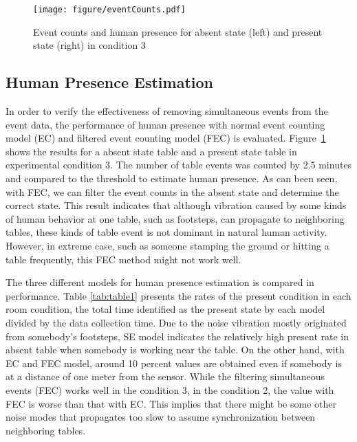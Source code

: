 \documentclass{sig-alternate-ipsn13}
\begin{document}



\begin{figure}[h]
  \centering
  \texttt{[image: figure/eventCounts.pdf]}
  \caption{Event counts and human presence for absent state (left) and present state (right) in condition 3}
  \label{fig:EventCounts}
\end{figure}

\subsection{Human Presence Estimation}
In order to verify the effectiveness of removing simultaneous events from the event data, the performance of human presence with normal event counting model (EC) and filtered event counting model (FEC) is evaluated. Figure~\ref{fig:EventCounts} shows the results for a absent state table and a present state table in experimental condition 3. The number of table events was counted by 2.5 minutes and compared to the threshold to estimate human presence. As can been seen, with FEC, we can filter the event counts in the absent state and determine the correct state. This result indicates that although vibration caused by some kinds of human behavior at one table, such as footsteps, can propagate to neighboring tables, these kinds of table event is not dominant in natural human activity. However, in extreme case, such as someone stamping the ground or hitting a table frequently, this FEC method might not work well.

The three different models for human presence estimation is compared in performance. Table \ref{tab:table1} presents the rates of the present condition in each room condition, the total time identified as the present state by each model divided by the data collection time. Due to the noise vibration mostly originated from somebody's footsteps, SE model indicates the relatively high present rate in absent table when somebody is working near the table. On the other hand, with EC and FEC model, around 10 percent values are obtained even if somebody is at a distance of one meter from the sensor. While the filtering simultaneous events (FEC) works well in the condition 3, in the condition 2, the value with FEC is worse than that with EC. This implies that there might be some other noise modes that propagates too slow to assume synchronization between neighboring tables.
\end{document}
